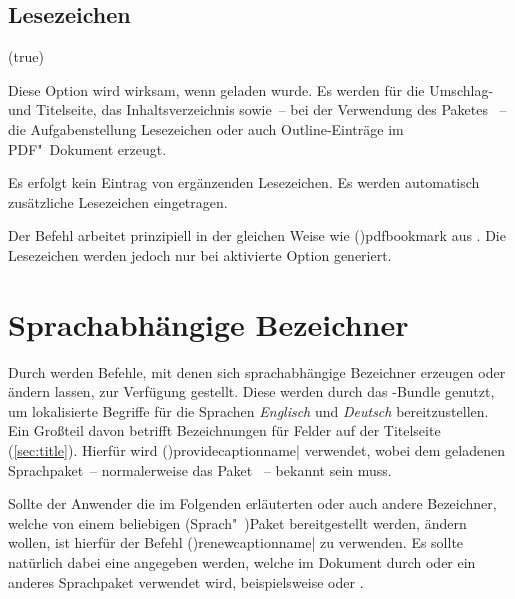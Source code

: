 \begin{DeclareEntity*}{}
\begin{DeclareEntity*}{}
\begin{DeclareEntity*}{}
\subsection{%
  Lesezeichen%
}

\begin{Declaration}
  {}
  (true)
\begin{Declaration}
  {}
\printdeclarationlist

Diese Option wird wirksam, wenn  geladen wurde. Es werden für 
die Umschlag- und Titelseite, das Inhaltsverzeichnis sowie~-- bei der 
Verwendung des Paketes ~-- die Aufgabenstellung 
Lesezeichen oder auch Outline-Einträge im PDF"~Dokument erzeugt.
%
\begin{DeclareValues}{}
  Es erfolgt kein Eintrag von ergänzenden Lesezeichen.
  Es werden automatisch zusätzliche Lesezeichen eingetragen.
\end{DeclareValues}
Der Befehl  arbeitet prinzipiell in der gleichen Weise wie 
\Macro(){pdfbookmark} aus . Die Lesezeichen 
werden jedoch nur bei aktivierte Option  generiert.
\end{Declaration}
\end{Declaration}



\section{%
  Sprachabhängige Bezeichner%
  \label{sec:localization}%
}

Durch \KOMAScript werden Befehle, mit denen sich sprachabhängige Bezeichner 
erzeugen oder ändern lassen, zur Verfügung gestellt. Diese werden durch das
\TUDScript-Bundle genutzt, um lokalisierte Begriffe für die Sprachen 
\emph{Englisch} und \emph{Deutsch} bereitzustellen. Ein Großteil davon betrifft 
Bezeichnungen für Felder auf der Titelseite (\autoref{sec:title}). Hierfür wird
\Macro(){providecaptionname|}
verwendet, wobei  dem geladenen Sprachpaket~-- normalerweise das 
Paket ~-- bekannt sein muss.

Sollte der Anwender die im Folgenden erläuterten oder auch andere Bezeichner, 
welche von einem beliebigen (Sprach"~)Paket bereitgestellt werden, ändern 
wollen, ist hierfür der Befehl
\Macro(){renewcaptionname|}
zu verwenden. Es sollte natürlich dabei eine  angegeben werden, 
welche im Dokument durch  oder ein anderes Sprachpaket verwendet 
wird, beispielsweise  oder . 


\end{DeclareEntity*}
\end{DeclareEntity*}
\end{DeclareEntity*}
